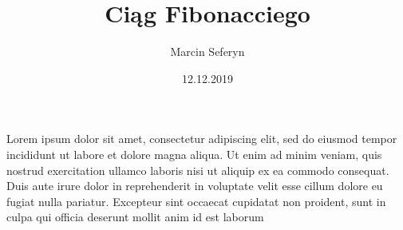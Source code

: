 \documentclass{article}
\title{Ciąg Fibonacciego}
\author{Marcin Seferyn}
\date{12.12.2019}
\begin{document}
\maketitle

Lorem ipsum dolor sit amet, consectetur adipiscing elit, sed do eiusmod tempor incididunt ut labore et dolore magna aliqua. Ut enim ad minim veniam, quis nostrud exercitation ullamco laboris nisi ut aliquip ex ea commodo consequat. Duis aute irure dolor in reprehenderit in voluptate velit esse cillum dolore eu fugiat nulla pariatur. Excepteur sint occaecat cupidatat non proident, sunt in culpa qui officia deserunt mollit anim id est laborum
\end{document}
